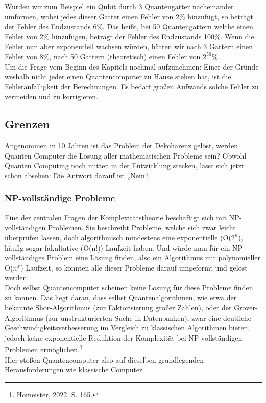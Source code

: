 Würden wir zum Beispiel ein Qubit durch 3 Quantengatter nacheinander umformen, wobei jedes dieser Gatter einen Fehler von 2\% hinzufügt, so beträgt der Fehler des Endzustands 6\%.
Das heißt, bei 50 Quantengattern welche einen Fehler von 2\% hinzufügen, beträgt der Fehler des Endzustands 100\%.
Wenn die Fehler nun aber exponentiell wachsen würden, hätten wir nach 3 Gattern einen Fehler von 8\%, nach 50 Gattern (theoretisch) einen Fehler von $2^{50}$\%.\\

Um die Frage vom Beginn des Kapitels nochmal aufzunehmen: Einer der Gründe weshalb nicht jeder einen Quantencomputer zu Hause stehen hat, ist die Fehleranfälligkeit der Berechnungen.
Es bedarf großen Aufwands solche Fehler zu vermeiden und zu korrigieren.\\


\subsection{Grenzen}
\label{subsec:grenzen}

Angenommen in 10 Jahren ist das Problem der Dekohärenz gelöst, werden Quanten Computer die Lösung aller mathematischen Probleme sein?
Obwohl Quanten Computing noch mitten in der Entwicklung stecken, lässt sich jetzt schon absehen: Die Antwort darauf ist „Nein“.\\

\subsubsection{NP-vollständige Probleme}
\label{subsubsec:np-vollstaendige-probleme}
Eine der zentralen Fragen der Komplexitätstheorie beschäftigt sich mit NP-vollständigen Problemen.
Sie beschreibt Probleme, welche sich zwar leicht überprüfen lassen, doch algorithmisch mindestens eine exponentielle (O($2^{n}$), häufig sogar fakultative (O(n!)) Laufzeit haben.
Und würde man für ein NP-vollständiges Problem eine Lösung finden, also ein Algorithmus mit polynomieller O($n^{x}$) Laufzeit, so könnten alle dieser Probleme darauf umgeformt und gelöst werden.\\

Doch selbst Quantencomputer scheinen keine Lösung für diese Probleme finden zu können.
Das liegt daran, dass selbst Quantenalgorithmen, wie etwa der bekannte Shor-Algorithmus (zur Faktorisierung großer Zahlen),
oder der Grover-Algorithmus (zur unstrukturierten Suche in Datenbanken), zwar eine deutliche Geschwindigkeitsverbesserung im Vergleich zu klassischen Algorithmen bieten,
jedoch keine exponentielle Reduktion der Komplexität bei NP-vollständigen Problemen ermöglichen.\footnote{Homeister, 2022, S. 165.}\\
Hier stoßen Quantencomputer also auf dieselben grundlegenden Herausforderungen wie klassische Computer.\\

